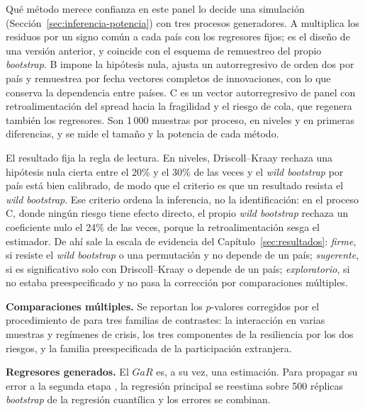 Qué método merece confianza en este panel lo decide una simulación (Sección~\ref{sec:inferencia-potencia}) con tres procesos generadores. A multiplica los residuos por un signo común a cada país con los regresores fijos; es el diseño de una versión anterior, y coincide con el esquema de remuestreo del propio \textit{bootstrap}. B impone la hipótesis nula, ajusta un autorregresivo de orden dos por país y remuestrea por fecha vectores completos de innovaciones, con lo que conserva la dependencia entre países. C es un vector autorregresivo de panel con retroalimentación del spread hacia la fragilidad y el riesgo de cola, que regenera también los regresores. Son 1\,000 muestras por proceso, en niveles y en primeras diferencias, y se mide el tamaño y la potencia de cada método.

El resultado fija la regla de lectura. En niveles, Driscoll--Kraay rechaza una hipótesis nula cierta entre el 20\% y el 30\% de las veces y el \textit{wild bootstrap} por país está bien calibrado, de modo que el criterio es que un resultado resista el \textit{wild bootstrap}. Ese criterio ordena la inferencia, no la identificación: en el proceso C, donde ningún riesgo tiene efecto directo, el propio \textit{wild bootstrap} rechaza un coeficiente nulo el 24\% de las veces, porque la retroalimentación sesga el estimador. De ahí sale la escala de evidencia del Capítulo~\ref{sec:resultados}: \emph{firme}, si resiste el \textit{wild bootstrap} o una permutación y no depende de un país; \emph{sugerente}, si es significativo solo con Driscoll--Kraay o depende de un país; \emph{exploratorio}, si no estaba preespecificado y no pasa la corrección por comparaciones múltiples.

\textbf{Comparaciones múltiples.} Se reportan los $p$-valores corregidos por el procedimiento de \citet{Holm1979} para tres familias de contrastes: la interacción en varias muestras y regímenes de crisis, los tres componentes de la resiliencia por los dos riesgos, y la familia preespecificada de la participación extranjera.

\textbf{Regresores generados.} El $GaR$ es, a su vez, una estimación. Para propagar su error a la segunda etapa \citep{Pagan1984}, la regresión principal se reestima sobre 500 réplicas \textit{bootstrap} de la regresión cuantílica y los errores se combinan.

